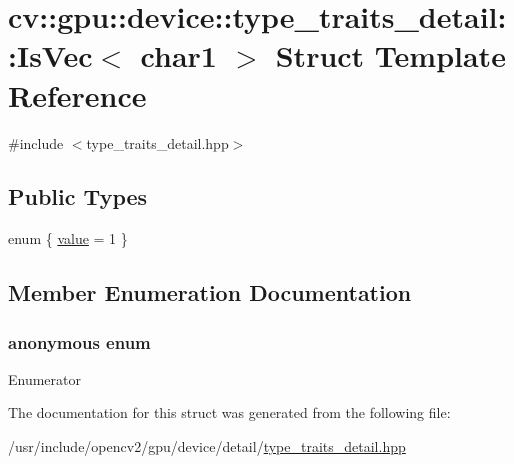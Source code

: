 \hypertarget{structcv_1_1gpu_1_1device_1_1type__traits__detail_1_1IsVec_3_01char1_01_4}{\section{cv\-:\-:gpu\-:\-:device\-:\-:type\-\_\-traits\-\_\-detail\-:\-:Is\-Vec$<$ char1 $>$ Struct Template Reference}
\label{structcv_1_1gpu_1_1device_1_1type__traits__detail_1_1IsVec_3_01char1_01_4}
}


{\ttfamily \#include $<$type\-\_\-traits\-\_\-detail.\-hpp$>$}

\subsection*{Public Types}
\begin{DoxyCompactItemize}
\item 
enum \{ \hyperlink{structcv_1_1gpu_1_1device_1_1type__traits__detail_1_1IsVec_3_01char1_01_4_afc61045f2136724ecca9c17ce971499daef2960ab22d59663bd4ab68df640e68b}{value} = 1
 \}
\end{DoxyCompactItemize}


\subsection{Member Enumeration Documentation}
\hypertarget{structcv_1_1gpu_1_1device_1_1type__traits__detail_1_1IsVec_3_01char1_01_4_afc61045f2136724ecca9c17ce971499d}{\subsubsection[{anonymous enum}]{\setlength{\rightskip}{0pt plus 5cm}anonymous enum}}\label{structcv_1_1gpu_1_1device_1_1type__traits__detail_1_1IsVec_3_01char1_01_4_afc61045f2136724ecca9c17ce971499d}
\begin{Desc}
\item[Enumerator]\par
\begin{description}
\item[{\em 
\hypertarget{structcv_1_1gpu_1_1device_1_1type__traits__detail_1_1IsVec_3_01char1_01_4_afc61045f2136724ecca9c17ce971499daef2960ab22d59663bd4ab68df640e68b}{value}\label{structcv_1_1gpu_1_1device_1_1type__traits__detail_1_1IsVec_3_01char1_01_4_afc61045f2136724ecca9c17ce971499daef2960ab22d59663bd4ab68df640e68b}
}]\end{description}
\end{Desc}


The documentation for this struct was generated from the following file\-:\begin{DoxyCompactItemize}
\item 
/usr/include/opencv2/gpu/device/detail/\hyperlink{type__traits__detail_8hpp}{type\-\_\-traits\-\_\-detail.\-hpp}\end{DoxyCompactItemize}
